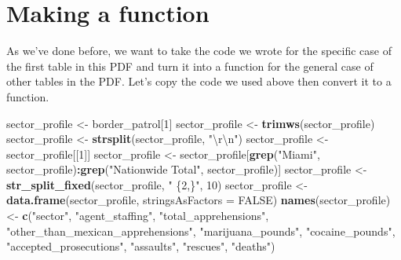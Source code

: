 \documentclass[
  12pt,
]{book}
\newenvironment{Shaded}{\begin{snugshade}}{\end{snugshade}}
\newcommand{\CharTok}[1]{\textcolor[rgb]{0.5,0.5,0.5}{#1}}
\newcommand{\DataTypeTok}[1]{\textcolor[rgb]{0.27,0.27,0.27}{#1}}
\newcommand{\DecValTok}[1]{\textcolor[rgb]{0.06,0.06,0.06}{#1}}
\newcommand{\KeywordTok}[1]{\textcolor[rgb]{0.27,0.27,0.27}{\textbf{#1}}}
\newcommand{\NormalTok}[1]{#1}
\newcommand{\OperatorTok}[1]{\textcolor[rgb]{0.43,0.43,0.43}{\textbf{#1}}}
\newcommand{\OtherTok}[1]{\textcolor[rgb]{0.37,0.37,0.37}{#1}}
\newcommand{\StringTok}[1]{\textcolor[rgb]{0.5,0.5,0.5}{#1}}
\begin{document}
\hypertarget{making-a-function}{%
\section{Making a function}\label{making-a-function}}

As we've done before, we want to take the code we wrote for the specific case of the first table in this PDF and turn it into a function for the general case of other tables in the PDF. Let's copy the code we used above then convert it to a function.

\begin{Shaded}
\begin{Highlighting}[]
\NormalTok{sector\_profile \textless{}{-}}\StringTok{ }\NormalTok{border\_patrol[}\DecValTok{1}\NormalTok{]}
\NormalTok{sector\_profile \textless{}{-}}\StringTok{ }\KeywordTok{trimws}\NormalTok{(sector\_profile)}
\NormalTok{sector\_profile \textless{}{-}}\StringTok{ }\KeywordTok{strsplit}\NormalTok{(sector\_profile, }\StringTok{"}\CharTok{\textbackslash{}r\textbackslash{}n}\StringTok{"}\NormalTok{)}
\NormalTok{sector\_profile \textless{}{-}}\StringTok{ }\NormalTok{sector\_profile[[}\DecValTok{1}\NormalTok{]]}
\NormalTok{sector\_profile \textless{}{-}}\StringTok{ }\NormalTok{sector\_profile[}\KeywordTok{grep}\NormalTok{(}\StringTok{"Miami"}\NormalTok{, sector\_profile)}\OperatorTok{:}\KeywordTok{grep}\NormalTok{(}\StringTok{"Nationwide Total"}\NormalTok{, sector\_profile)]}
\NormalTok{sector\_profile \textless{}{-}}\StringTok{ }\KeywordTok{str\_split\_fixed}\NormalTok{(sector\_profile, }\StringTok{" \{2,\}"}\NormalTok{, }\DecValTok{10}\NormalTok{)}
\NormalTok{sector\_profile \textless{}{-}}\StringTok{ }\KeywordTok{data.frame}\NormalTok{(sector\_profile, }\DataTypeTok{stringsAsFactors =} \OtherTok{FALSE}\NormalTok{)}
\KeywordTok{names}\NormalTok{(sector\_profile) \textless{}{-}}\StringTok{ }\KeywordTok{c}\NormalTok{(}\StringTok{"sector"}\NormalTok{,}
                           \StringTok{"agent\_staffing"}\NormalTok{,}
                           \StringTok{"total\_apprehensions"}\NormalTok{,}
                           \StringTok{"other\_than\_mexican\_apprehensions"}\NormalTok{, }
                           \StringTok{"marijuana\_pounds"}\NormalTok{,}
                           \StringTok{"cocaine\_pounds"}\NormalTok{,}
                           \StringTok{"accepted\_prosecutions"}\NormalTok{,}
                           \StringTok{"assaults"}\NormalTok{,}
                           \StringTok{"rescues"}\NormalTok{,}
                           \StringTok{"deaths"}\NormalTok{)}
\end{Highlighting}
\end{Shaded}
\end{document}
